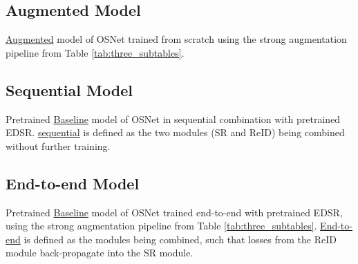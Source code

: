 \subsection*{\hypertarget{model:augmented}{Augmented} Model}
\hyperlink{model:augmented}{Augmented} model of \acs{OSNet} trained from scratch using the strong augmentation pipeline from Table \ref{tab:three_subtables}.

\subsection*{\hypertarget{model:sequential}{Sequential} Model}
Pretrained \hyperlink{model:baseline}{Baseline} model of \acs{OSNet} in sequential combination with pretrained \acs{EDSR}. \hyperlink{model:sequential}{sequential} is defined as the two modules (\acs{SR} and \acs{ReID}) being combined without further training.

\subsection*{\hypertarget{model:endtoend}{End-to-end} Model}
Pretrained \hyperlink{model:baseline}{Baseline} model of \acs{OSNet} trained end-to-end with pretrained \acs{EDSR}, using the strong augmentation pipeline from Table \ref{tab:three_subtables}. \hyperlink{model:endtoend}{End-to-end} is defined as the modules being combined, such that losses from the \acs{ReID} module back-propagate into the \acs{SR} module.


